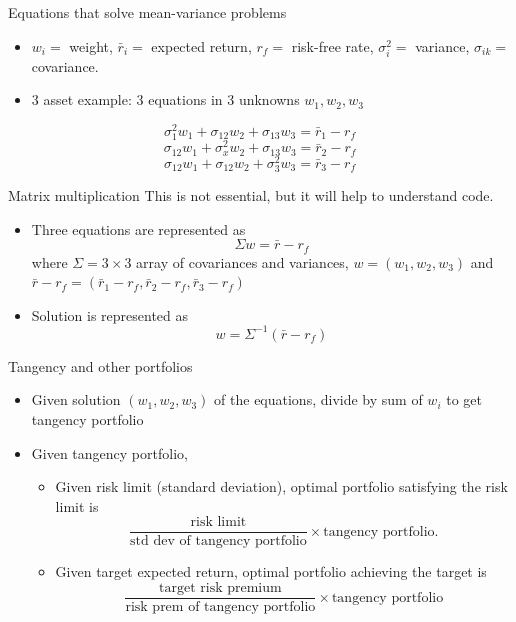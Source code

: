 \documentclass[10pt]{beamer}
\begin{document}
\begin{frame}{Equations that solve mean-variance problems}
\begin{itemize}
\item $w_i=$ weight, $\bar r_i=$ expected return, $r_f=$ risk-free rate, $\sigma_i^2=$ variance, $\sigma_{ik} =$ covariance.
\item 3 asset example: 3 equations in 3 unknowns $w_1, w_2, w_3$
\end{itemize}

$$\sigma_1^2 w_1 + \sigma_{12} w_2 + \sigma_{13}w_3 = \bar r_1 - r_f$$
$$\sigma_{12} w_1 + \sigma_x^2 w_2 + \sigma_{13}w_3 = \bar r_2 - r_f$$
$$\sigma_{12} w_1 + \sigma_{12} w_2 + \sigma_3^2w_3 = \bar r_3 - r_f$$
\end{frame}

\begin{frame}{Matrix multiplication}
    This is not essential, but it will help to understand code.
    \begin{itemize}
    \item Three equations are represented as 
    $$\Sigma w = \bar r - r_f$$
    where $\Sigma = 3 \times 3$ array of covariances and variances, $w=(w_1, w_2, w_3)$ and $\bar r - r_f = (\bar r_1-r_f, \bar r_2 - r_f, \bar r_3 - r_f)$
    \item Solution is represented as 
    $$w = \Sigma^{-1}(\bar r - r_f)$$
    \end{itemize}
    \end{frame}

\begin{frame}{Tangency and other portfolios}
\begin{itemize}
\item Given solution $(w_1, w_2, w_3)$ of the equations, divide by sum of $w_i$ to get tangency portfolio
\item Given tangency portfolio,
\begin{itemize}
    \item Given risk limit (standard deviation), optimal portfolio satisfying the risk limit is
    $$\frac{\text{risk limit}}{\text{std dev of tangency portfolio}} \times \text{tangency portfolio}.$$
    \item Given target expected return, optimal portfolio achieving the target is
    $$\frac{\text{target risk premium}}{\text{risk prem of tangency portfolio}} \times \text{tangency portfolio}$$
    \end{itemize}
\end{itemize}
\end{frame}
\end{document}
